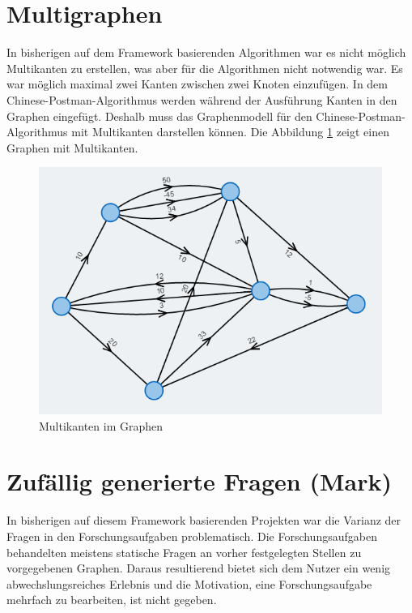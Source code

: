 \section{Multigraphen}%
In bisherigen auf dem Framework basierenden Algorithmen war es nicht möglich Multikanten zu erstellen, was aber für die Algorithmen nicht notwendig war. Es war möglich maximal zwei Kanten zwischen zwei Knoten einzufügen. 
In dem Chinese-Postman-Algorithmus werden während der Ausführung Kanten in den Graphen eingefügt. Deshalb muss das Graphenmodell für den Chinese-Postman-Algorithmus mit Multikanten darstellen können. Die Abbildung \ref{fig:multigraph} zeigt einen Graphen mit Multikanten.
\begin{figure}[h!]
	\centering
	\includegraphics[width=\textwidth]{figures/multigraph}
	\caption[Multigraph]{Multikanten im Graphen}\label{fig:multigraph}
\end{figure}

\section{Zufällig generierte Fragen (Mark)}
In bisherigen auf diesem Framework basierenden Projekten war die Varianz der Fragen in den Forschungsaufgaben problematisch. Die Forschungsaufgaben behandelten meistens statische Fragen an vorher festgelegten Stellen zu vorgegebenen Graphen. Daraus resultierend bietet sich dem Nutzer ein wenig abwechslungsreiches Erlebnis und die Motivation, eine Forschungsaufgabe mehrfach zu bearbeiten, ist nicht gegeben.

